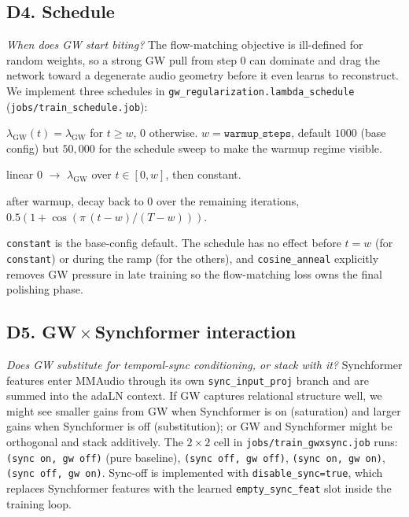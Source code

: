 \subsection*{D4. Schedule}
\emph{When does GW start biting?}
The flow-matching objective is ill-defined for random weights, so
a strong GW pull from step 0 can dominate and drag the network
toward a degenerate audio geometry before it even learns to
reconstruct. We implement three schedules in
\texttt{gw\_regularization.lambda\_schedule}
(\texttt{jobs/train\_schedule.job}):
\begin{description}[leftmargin=2em]
  \item[\texttt{constant}] $\lambda_{\mathrm{GW}}(t) = \lambda_{\mathrm{GW}}$
    for $t \ge w$, $0$ otherwise. $w=\texttt{warmup\_steps}$,
    default $1000$ (base config) but $50{,}000$ for the schedule
    sweep to make the warmup regime visible.
  \item[\texttt{linear\_rampup}] linear 0 $\to$ $\lambda_{\mathrm{GW}}$
    over $t \in [0, w]$, then constant.
  \item[\texttt{cosine\_anneal}] after warmup, decay back to 0
    over the remaining iterations, $0.5(1 + \cos(\pi\,(t-w)/(T-w)))$.
\end{description}
\texttt{constant} is the base-config default. The schedule has no
effect before $t = w$ (for \texttt{constant}) or during the ramp
(for the others), and \texttt{cosine\_anneal} explicitly removes
GW pressure in late training so the flow-matching loss owns the
final polishing phase.

\subsection*{D5. GW\,$\times$\,Synchformer interaction}
\emph{Does GW substitute for temporal-sync conditioning, or
stack with it?}
Synchformer features enter MMAudio through its own
\texttt{sync\_input\_proj} branch and are summed into the adaLN
context. If GW captures relational structure well, we might see
smaller gains from GW when Synchformer is on (saturation) and
larger gains when Synchformer is off (substitution); or GW and
Synchformer might be orthogonal and stack additively. The
$2 \times 2$ cell in \texttt{jobs/train\_gwxsync.job} runs:
\texttt{(sync\,on, gw\,off)} (pure baseline),
\texttt{(sync\,off, gw\,off)},
\texttt{(sync\,on, gw\,on)},
\texttt{(sync\,off, gw\,on)}. Sync-off is implemented with
\texttt{disable\_sync=true}, which replaces Synchformer features
with the learned \texttt{empty\_sync\_feat} slot inside the
training loop.

